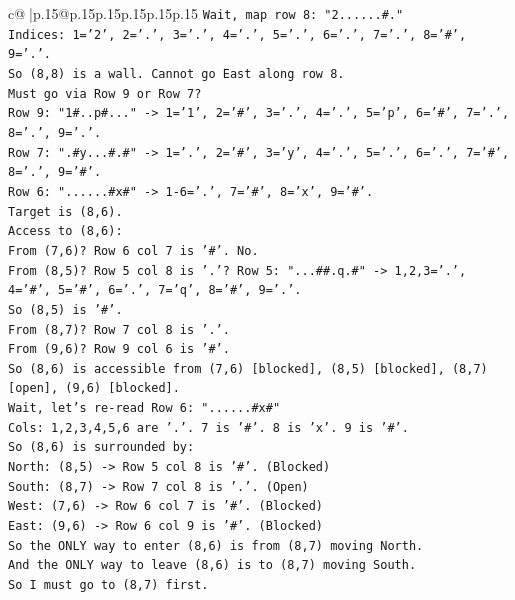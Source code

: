 \documentclass{article}
\begin{document}
{\begin{supertabular}{c@{$\;$}|p{.15\linewidth}@{}p{.15\linewidth}p{.15\linewidth}p{.15\linewidth}p{.15\linewidth}p{.15\linewidth}}
{{{\texttt{Wait, map row 8: "2......\#."} \\
\texttt{Indices: 1='2', 2='.', 3='.', 4='.', 5='.', 6='.', 7='.', 8='\#', 9='.'.} \\
\texttt{So (8,8) is a wall. Cannot go East along row 8.} \\
\texttt{Must go via Row 9 or Row 7?} \\
\texttt{Row 9: "1\#..p\#..." {-}> 1='1', 2='\#', 3='.', 4='.', 5='p', 6='\#', 7='.', 8='.', 9='.'.} \\
\texttt{Row 7: ".\#y...\#.\#" {-}> 1='.', 2='\#', 3='y', 4='.', 5='.', 6='.', 7='\#', 8='.', 9='\#'.} \\
\texttt{Row 6: "......\#x\#" {-}> 1{-}6='.', 7='\#', 8='x', 9='\#'.} \\
\texttt{Target is (8,6).} \\
\texttt{Access to (8,6):} \\
\texttt{From (7,6)? Row 6 col 7 is '\#'. No.} \\
\texttt{From (8,5)? Row 5 col 8 is '.'? Row 5: "...\#\#.q.\#" {-}> 1,2,3='.', 4='\#', 5='\#', 6='.', 7='q', 8='\#', 9='.'.} \\
\texttt{So (8,5) is '\#'.} \\
\texttt{From (8,7)? Row 7 col 8 is '.'.} \\
\texttt{From (9,6)? Row 9 col 6 is '\#'.} \\
\texttt{So (8,6) is accessible from (7,6) {[}blocked{]}, (8,5) {[}blocked{]}, (8,7) {[}open{]}, (9,6) {[}blocked{]}.} \\
\texttt{Wait, let's re{-}read Row 6: "......\#x\#"} \\
\texttt{Cols: 1,2,3,4,5,6 are '.'. 7 is '\#'. 8 is 'x'. 9 is '\#'.} \\
\texttt{So (8,6) is surrounded by:} \\
\texttt{North: (8,5) {-}> Row 5 col 8 is '\#'. (Blocked)} \\
\texttt{South: (8,7) {-}> Row 7 col 8 is '.'. (Open)} \\
\texttt{West: (7,6) {-}> Row 6 col 7 is '\#'. (Blocked)} \\
\texttt{East: (9,6) {-}> Row 6 col 9 is '\#'. (Blocked)} \\
\texttt{So the ONLY way to enter (8,6) is from (8,7) moving North.} \\
\texttt{And the ONLY way to leave (8,6) is to (8,7) moving South.} \\
\texttt{So I must go to (8,7) first.} \\
\\ 
}}}
\end{supertabular}}
\end{document}
